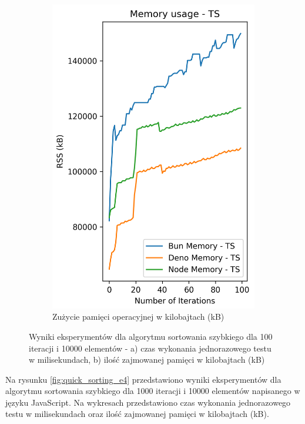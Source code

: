 \begin{figure}[H]
\begin{subfigure}[b]{0.42\textwidth}
    \includegraphics[width=\textwidth]{Figures/sorting/sorting_quick_100_10000_ts_memory.png}
    \caption{Zużycie pamięci operacyjnej w kilobajtach (kB)}
    \label{fig:quick_sorting_e3_ts_memory}
  \end{subfigure}
  \caption{Wyniki eksperymentów dla algorytmu sortowania szybkiego dla 100 iteracji i 10000 elementów - a) czas wykonania jednorazowego testu w milisekundach, b) ilość zajmowanej pamięci w kilobajtach (kB)}
  \label{fig:quick_sorting_e3_ts}
\end{figure}

Na rysunku \ref{fig:quick_sorting_e4} przedstawiono wyniki eksperymentów dla algorytmu sortowania szybkiego dla 1000 iteracji i 10000 elementów napisanego w języku JavaScript. Na wykresach przedstawiono czas wykonania jednorazowego testu w milisekundach oraz ilość zajmowanej pamięci w kilobajtach (kB).


